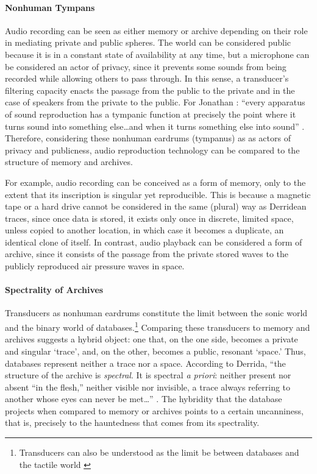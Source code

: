 \paragraph{Nonhuman Tympans}
Audio recording can be seen as either memory or archive depending on their role in mediating private and public spheres. The world can be considered public because it is in a constant state of availability at any time, but a microphone can be considered an actor of privacy, since it prevents some sounds from being recorded while allowing  others to pass through. In this sense, a transducer's filtering capacity enacts the passage from the public to the private and in the case of speakers from the private to the public. For Jonathan \textcite{Ste03:Aud}: ``every apparatus of sound reproduction has a tympanic function at precisely the point where it turns sound into something else\dots and when it turns something else into sound'' \parencite[34]{Ste03:Aud}. Therefore, considering these nonhuman eardrums (tympanus) as as actors of privacy and publicness, audio reproduction technology can be compared to the structure of memory and archives. 

For example, audio recording can be conceived as a form of memory, only to the extent that its inscription is singular yet reproducible. This is because a magnetic tape or a hard drive cannot be considered in the same (plural) way as Derridean traces, since once data is stored, it exists only once in discrete, limited space, unless copied to another location, in which case it becomes a duplicate, an identical clone of itself. In contrast, audio playback can be considered a form of archive, since it consists of the passage from the private stored waves to the publicly reproduced air pressure waves in space.

\paragraph{Spectrality of Archives}
Transducers as nonhuman eardrums constitute the limit between the sonic world and the binary world of databases.\footnote{Transducers can also be understood as the limit be between databases and the tactile world \parencite[223]{Eck13:Bet}} Comparing these transducers to memory and archives suggests a hybrid object: one that, on the one side, becomes a private and singular `trace', and, on the other, becomes a public, resonant `space.' Thus, databases represent neither a trace nor a space. According to Derrida, ``the structure of the archive is \textit{spectral}. It is spectral \textit{a priori}: neither present nor absent ``in the flesh,'' neither visible nor invisible, a trace always referring to another whose eyes can never be met\dots'' \parencite[54]{Der95:Arc}. The hybridity that the database projects when compared to memory or archives points to a certain uncanniness, that is, precisely to the hauntedness that comes from its spectrality. 

